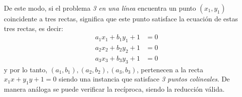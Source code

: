 \documentclass[dcc,uchile]{fcfmcourse}
\theoremstyle{plain}
\theoremstyle{definition}
\begin{document}
\begin{problems}
De este modo, si el problema \textit{3 en una línea} encuentra un punto $(x_{1}, y_{1})$ coincidente a tres rectas, significa que este punto satisface la ecuación de estas tres rectas, es decir:
\begin{align*}
    a_{1}x_{1} + b_{1}y_{1} + 1 &= 0\\
    a_{2}x_{2} + b_{2}y_{2} + 1 &= 0\\
    a_{3}x_{3} + b_{3}y_{3} + 1 &= 0
\end{align*}
y por lo tanto, $(a_{1}, b_{1}), (a_{2}, b_{2}), (a_{3}, b_{3})$, pertenecen a la recta $x_{1}x + y_{1}y + 1 = 0$ siendo una instancia que satisface \textit{3 puntos colineales}. De manera análoga se puede verificar la recíproca, siendo la reducción válida.
\end{problems}
\end{document}
